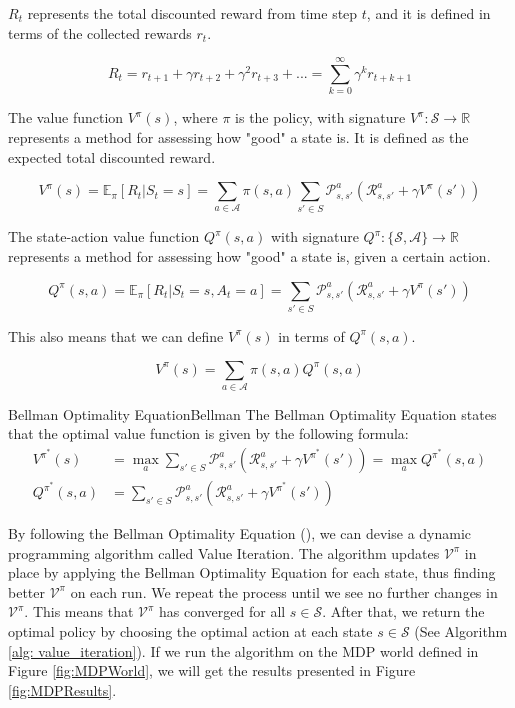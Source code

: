 $R_t$ represents the total discounted reward from time step $t$, and it is defined in terms of the collected rewards $r_t$.

$$R_t = r_{t+1} + \gamma r_{t + 2} + \gamma^2 r_{t + 3} + ... = \sum_{k = 0}^{\infty} \gamma^k r_{t + k + 1}$$

The value function $V^{\pi}(s)$, where $\pi$ is the policy,  with signature $V^{\pi} \colon \mathcal{S} \xrightarrow{} \mathbb{R}$ represents a method for assessing how "good" a state is. It is defined as the expected total discounted reward.

$$V^{\pi}(s) = \mathbb{E}_{\pi}[R_t|S_t = s] = \sum_{a \in \mathcal{A}} \pi(s, a) \sum_{s' \in S} \mathcal{P}_{s, s'}^a (\mathcal{R}_{s, s'}^a + \gamma V^{\pi}(s'))$$

The state-action value function $Q^{\pi}(s, a)$ with signature $Q^{\pi} \colon \{ \mathcal{S}, \mathcal{A} \} \xrightarrow{} \mathbb{R}$ represents a method for assessing how "good" a state is, given a certain action.

$$Q^{\pi}(s, a) = \mathbb{E}_{\pi}[R_t|S_t = s, A_t = a] = \sum_{s' \in S} \mathcal{P}_{s, s'}^a (\mathcal{R}_{s, s'}^a + \gamma V^{\pi}(s'))$$

This also means that we can define $V^{\pi}(s)$ in terms of $Q^{\pi}(s, a)$.

$$V^{\pi}(s) = \sum_{a \in \mathcal{A}} \pi(s, a) Q^{\pi}(s, a)$$

\begin{Theo}{Bellman Optimality Equation}{Bellman}
The Bellman Optimality Equation states that the optimal value function is given by the following formula:
\begin{align*}
    V^{\pi^{*}}(s) &= \max_{a} \sum_{s' \in S} \mathcal{P}_{s, s'}^a (\mathcal{R}_{s, s'}^a + \gamma V^{\pi^{*}}(s')) = \max_{a} Q^{\pi^{*}}(s, a)\\
    Q^{\pi^{*}}(s, a) &= \sum_{s' \in S} \mathcal{P}_{s, s'}^a (\mathcal{R}_{s, s'}^a + \gamma V^{\pi^{*}}(s'))
\end{align*}
\end{Theo}

By following the Bellman Optimality Equation (), we can devise a dynamic programming algorithm called Value Iteration. The algorithm updates $\mathcal{V^{\pi}}$ in place by applying the Bellman Optimality Equation for each state, thus finding better $\mathcal{V^{\pi}}$ on each run. We repeat the process until we see no further changes in $\mathcal{V^{\pi}}$. This means that $\mathcal{V^{\pi}}$ has converged for all $s \in \mathcal{S}$. After that, we return the optimal policy by choosing the optimal action at each state $s \in \mathcal{S}$ (See Algorithm \ref{alg: value_iteration}). If we run the algorithm on the MDP world defined in Figure \ref{fig:MDPWorld}, we will get the results presented in Figure \ref{fig:MDPResults}.

